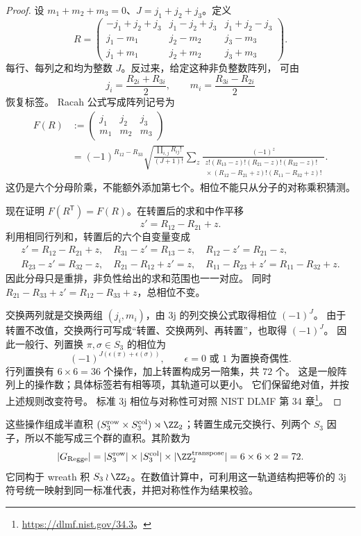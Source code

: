 \begin{proof}
设 $m_1+m_2+m_3=0$、$J=j_1+j_2+j_3$。定义
\[
R=\begin{pmatrix}
-j_1+j_2+j_3&j_1-j_2+j_3&j_1+j_2-j_3\\
j_1-m_1&j_2-m_2&j_3-m_3\\
j_1+m_1&j_2+m_2&j_3+m_3
\end{pmatrix}.
\]
每行、每列之和均为整数 $J$。反过来，给定这种非负整数阵列，
可由
\[
j_i=\frac{R_{2i}+R_{3i}}2,\qquad
m_i=\frac{R_{3i}-R_{2i}}2
\]
恢复标签。
Racah 公式写成阵列记号为
\[
\begin{aligned}
F(R)&:=\begin{pmatrix}j_1&j_2&j_3\\m_1&m_2&m_3\end{pmatrix}\\
&=(-1)^{R_{12}-R_{33}}
\sqrt{\frac{\prod_{i,j}R_{ij}!}{(J+1)!}}
\sum_z\frac{(-1)^z}{\begin{gathered}
z!(R_{13}-z)!(R_{21}-z)!(R_{32}-z)!\\[-2pt]
{}\times(R_{12}-R_{21}+z)!(R_{11}-R_{32}+z)!
\end{gathered}}.
\end{aligned}
\]
这仍是六个分母阶乘，不能额外添加第七个。相位不能只从分子的对称乘积猜测。

现在证明 $F(R^{\mathsf T})=F(R)$。在转置后的求和中作平移
\[
z'=R_{12}-R_{21}+z.
\]
利用相同行列和，转置后的六个自变量变成
\[
\begin{gathered}
z'=R_{12}-R_{21}+z,\quad
R_{31}-z'=R_{13}-z,\quad R_{12}-z'=R_{21}-z,\\
R_{23}-z'=R_{32}-z,\quad R_{21}-R_{12}+z'=z,\quad
R_{11}-R_{23}+z'=R_{11}-R_{32}+z.
\end{gathered}
\]
因此分母只是重排，非负性给出的求和范围也一一对应。
同时 $R_{21}-R_{33}+z'=R_{12}-R_{33}+z$，总相位不变。

交换两列就是交换两组 $(j_i,m_i)$，由 3j 的列交换公式取得相位 $(-1)^J$。
由于转置不改值，交换两行可写成“转置、交换两列、再转置”，也取得 $(-1)^J$。
因此一般行、列置换 $\pi,\sigma\in S_3$ 的相位为
\[
(-1)^{J(\epsilon(\pi)+\epsilon(\sigma))},
\qquad \epsilon=0\text{ 或 }1\text{ 为置换奇偶性}.
\]
行列置换有 $6\times6=36$ 个操作，加上转置构成另一陪集，共 $72$ 个。
这是一般阵列上的操作数；具体标签若有相等项，其轨道可以更小。
它们保留绝对值，并按上述规则改变符号。
标准 3j 相位与对称性可对照 NIST DLMF 第 34 章\footnote{\url{https://dlmf.nist.gov/34.3}。}。
\end{proof}

\par\medskip
\par\medskip
这些操作组成半直积 $(S_3^{\mathrm{row}}\times S_3^{\mathrm{col}})\rtimes\ZZ_2$；转置生成元交换行、列两个 $S_3$ 因子，所以不能写成三个群的直积。其阶数为
\begin{equation*}
|G_{\text{Regge}}|=|S_3^{\text{row}}|\times|S_3^{\text{col}}|\times|\ZZ_2^{\text{transpose}}|=6\times6\times2=72.
\end{equation*}
它同构于 wreath 积 $S_3\wr\ZZ_2$。在数值计算中，可利用这一轨道结构把等价的 3j 符号统一映射到同一标准代表，并把对称性作为结果校验。
